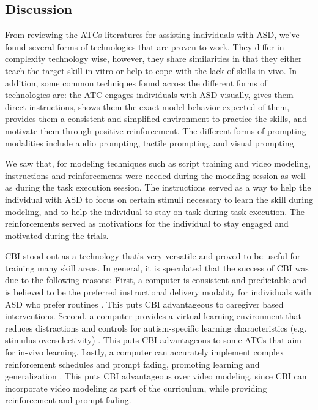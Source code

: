 \subsection{Discussion}
From reviewing the ATCs literatures for assisting individuals with ASD, we've found several forms of technologies that are proven to work.  They differ in complexity technology wise, however, they share similarities in that they either teach the target skill in-vitro or help to cope with the lack of skills in-vivo.  In addition, some common techniques found across the different forms of technologies are: the ATC engages individuals with ASD visually, gives them direct instructions, shows them the exact model behavior expected of them, provides them a consistent and simplified environment to practice the skills, and motivate them through positive reinforcement.  The different forms of prompting modalities include audio prompting, tactile prompting, and visual prompting.

We saw that, for modeling techniques such as script training and video modeling, instructions and reinforcements were needed during the modeling session as well as during the task execution session.  The instructions served as a way to help the individual with ASD to focus on certain stimuli necessary to learn the skill during modeling, and to help the individual to stay on task during task execution.  The reinforcements served as motivations for the individual to stay engaged and motivated during the trials.

CBI stood out as a technology that's very versatile and proved to be useful for training many skill areas.  In general, it is speculated that the success of CBI was due to the following reasons: First, a computer is consistent and predictable and is believed to be the preferred instructional delivery modality for individuals with ASD who prefer routines \cite{ramdoss2011use}.  This puts CBI advantageous to caregiver based interventions.  Second, a computer provides a virtual learning environment that reduces distractions and controls for autism-specific learning characteristics (e.g. stimulus overselectivity) \cite{lovaas1979stimulus}.  This puts CBI advantageous to some ATCs that aim for in-vivo learning.  Lastly, a computer can accurately implement complex reinforcement schedules and prompt fading, promoting learning and generalization \cite{ramdoss2011useb}.  This puts CBI advantageous over video modeling, since CBI can incorporate video modeling as part of the curriculum, while providing reinforcement and prompt fading.

